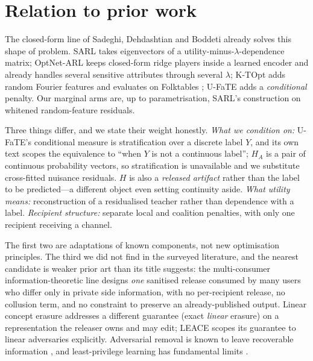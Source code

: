 \documentclass[10pt]{article}
\begin{document}
\section{Relation to prior work}
\label{sec:related}

The closed-form line of Sadeghi, Dehdashtian and Boddeti already solves this shape of problem. SARL
\citep{sadeghi2019sarl} takes eigenvectors of a utility-minus-$\lambda$-dependence matrix; OptNet-ARL
\citep{sadeghi2021optnetarl} keeps closed-form ridge players inside a learned encoder and already
handles several sensitive attributes through several $\lambda$; K-TOpt \citep{sadeghi2022ktopt} adds
random Fourier features and evaluates on Folktables \citep{ding2021retiring}; U-FaTE
\citep{dehdashtian2024ufate} adds a \emph{conditional} penalty. Our marginal arms are, up to
parametrisation, SARL's construction on whitened random-feature residuals.

Three things differ, and we state their weight honestly. \emph{What we condition on:} U-FaTE's
conditional measure is stratification over a discrete label $Y$, and its own text scopes the
equivalence to ``when $Y$ is not a continuous label''; $H_A$ is a pair of continuous probability
vectors, so stratification is unavailable and we substitute cross-fitted nuisance residuals. $H$ is
also a \emph{released artifact} rather than the label to be predicted---a different object even
setting continuity aside. \emph{What utility means:} reconstruction of a residualised teacher rather
than dependence with a label. \emph{Recipient structure:} separate local and coalition penalties,
with only one recipient receiving a channel.

The first two are adaptations of known components, not new optimisation principles. The third we did
not find in the surveyed literature, and the nearest candidate is weaker prior art than its title
suggests: the multi-consumer information-theoretic line \citep{sankar2013utility} designs \emph{one}
sanitised release consumed by many users who differ only in private side information, with no
per-recipient release, no collusion term, and no constraint to preserve an already-published output.
Linear concept erasure \citep{belrose2023leace,holstege2025splince} addresses a different guarantee
(exact \emph{linear} erasure) on a representation the releaser owns and may edit; LEACE scopes its
guarantee to linear adversaries explicitly. Adversarial removal is known to leave recoverable
information \citep{elazar2018adversarial}, and least-privilege learning has fundamental limits
\citep{stadler2024leastprivilege}.
\end{document}
